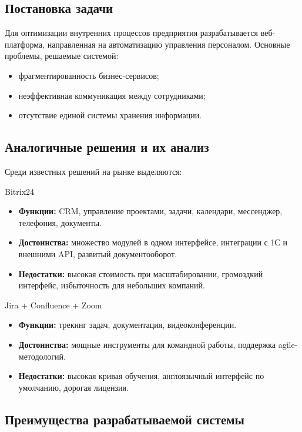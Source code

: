 \subsection{Постановка задачи}

Для оптимизации внутренних процессов предприятия разрабатывается веб-платформа, направленная на автоматизацию управления персоналом. Основные проблемы, решаемые системой:
\begin{itemize}
  \item фрагментированность бизнес-сервисов;
  \item неэффективная коммуникация между сотрудниками;
  \item отсутствие единой системы хранения информации.
\end{itemize}

\subsection{Аналогичные решения и их анализ}

Среди известных решений на рынке выделяются:

Bitrix24
\begin{itemize}
  \item \textbf{Функции:} CRM, управление проектами, задачи, календари, мессенджер, телефония, документы.
  \item \textbf{Достоинства:} множество модулей в одном интерфейсе, интеграции с 1С и внешними API, развитый документооборот.
  \item \textbf{Недостатки:} высокая стоимость при масштабировании, громоздкий интерфейс, избыточность для небольших компаний.
\end{itemize}

Jira + Confluence + Zoom
\begin{itemize}
  \item \textbf{Функции:} трекинг задач, документация, видеоконференции.
  \item \textbf{Достоинства:} мощные инструменты для командной работы, поддержка agile-методологий.
  \item \textbf{Недостатки:} высокая кривая обучения, англоязычный интерфейс по умолчанию, дорогая лицензия.
\end{itemize}

\subsection{Преимущества разрабатываемой системы}

